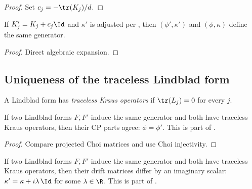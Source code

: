 \begin{proof}
    \leanok
    Set $c_j = -\tr(K_j)/d$.
\end{proof}

\begin{theorem}
    \label{thm:generator_shift_invariance}
    \leanok
    If $K_j' = K_j+c_j\Id$ and $\kappa'$ is adjusted per
    \cite[Equation~(7.19)]{Wolf2012Quantum},
    then $(\phi',\kappa')$ and $(\phi,\kappa)$ define the same generator.
\end{theorem}

\begin{proof}
    \leanok
    Direct algebraic expansion.
\end{proof}

\subsection{Uniqueness of the traceless Lindblad form}

\begin{definition}\label{def:has_traceless_kraus}
    \leanok
    A Lindblad form has \emph{traceless Kraus operators} if
    $\tr(L_j) = 0$ for every $j$.
\end{definition}

\begin{theorem}
    \label{thm:generatorDecomp_traceless_unique_phi}
    \leanok
    If two Lindblad forms $F,F'$ induce the same generator and
    both have traceless Kraus operators, then their CP parts agree:
    $\phi = \phi'$.
    This is part of \cite[Proposition~7.4(2)]{Wolf2012Quantum}.
\end{theorem}

\begin{proof}\leanok
    Compare projected Choi matrices and use Choi injectivity.
\end{proof}

\begin{theorem}
    \label{thm:generatorDecomp_traceless_unique_kappa}
    \leanok
    If two Lindblad forms $F,F'$ induce the same generator and
    both have traceless Kraus operators, then their drift matrices
    differ by an imaginary scalar: $\kappa' = \kappa+i\lambda\,\Id$
    for some $\lambda \in \R$.
    This is part of \cite[Proposition~7.4(2)]{Wolf2012Quantum}.
\end{theorem}

